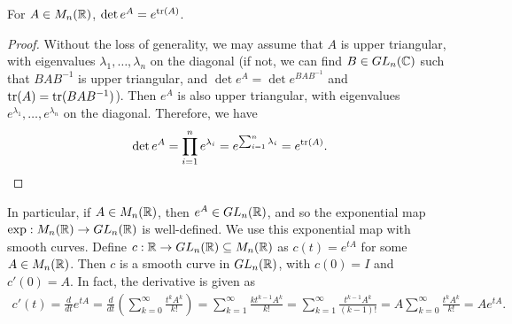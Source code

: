 \begin{proposition}
    For $A \in M_{n}(\mathbb{R})$, $\det e^{A} = e^{\operatorname{tr}(A)}$.
\end{proposition}
\begin{proof}
    Without the loss of generality, we may assume that $A$ is upper triangular, with eigenvalues $\lambda_{1},\ldots,\lambda_{n}$ on the diagonal (if not, we can find $B \in GL_{n}(\mathbb{C})$ such that $BAB^{-1}$ is upper triangular, and $\det e^{A} = \det e^{BAB^{-1}}$ and $\operatorname{tr}(A) = \operatorname{tr}(BAB^{-1})$). Then $e^{A}$ is also upper triangular, with eigenvalues $e^{\lambda_{1}},\ldots,e^{\lambda_{n}}$ on the diagonal. Therefore, we have
    \begin{align}
        \det e^{A} = \prod_{i=1}^{n} e^{\lambda_{i}} = e^{\sum_{i=1}^{n} \lambda_{i}} = e^{\operatorname{tr}(A)}.
    \end{align}
\end{proof}
In particular, if $A \in M_{n}(\mathbb{R})$, then $e^{A} \in GL_{n}(\mathbb{R})$, and so the exponential map $\exp:M_{n}(\mathbb{R}) \to GL_{n}(\mathbb{R})$ is well-defined. We use this exponential map with smooth curves. Define $c:\mathbb{R} \to GL_{n}(\mathbb{R}) \subseteq M_{n}(\mathbb{R})$ as $c(t) = e^{tA}$ for some $A \in M_{n}(\mathbb{R})$. Then $c$ is a smooth curve in $GL_{n}(\mathbb{R})$, with $c(0) = I$ and $c'(0) = A$. In fact, the derivative is given as
\begin{align}
    c'(t) = \frac{d}{dt} e^{tA} = \frac{d}{dt} \left( \sum_{k=0}^{\infty} \frac{t^{k}A^{k}}{k!} \right) = \sum_{k=1}^{\infty} \frac{kt^{k-1}A^{k}}{k!} = \sum_{k=1}^{\infty} \frac{t^{k-1}A^{k}}{(k-1)!} = A \sum_{k=0}^{\infty} \frac{t^{k}A^{k}}{k!} = Ae^{tA}.
\end{align}

